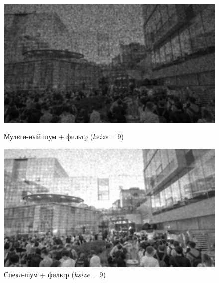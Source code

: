 \documentclass[a4paper]{article}
\begin{document}
\begin{figure}[H]
    \begin{minipage}{0.49\textwidth}
        \centering \includegraphics[width=\textwidth]{images/3_nonlinear_filters/multiplicative - median (ksize=9).jpg}
        \caption{Мульти-ный шум + фильтр ($ksize = 9$)}
    \end{minipage}\hfill
    \begin{minipage}{0.49\textwidth}
        \centering \includegraphics[width=\textwidth]{images/3_nonlinear_filters/speckle - median (ksize=9).jpg}
        \caption{Спекл-шум + фильтр ($ksize = 9$)}
    \end{minipage}
\end{figure}
\end{document}
